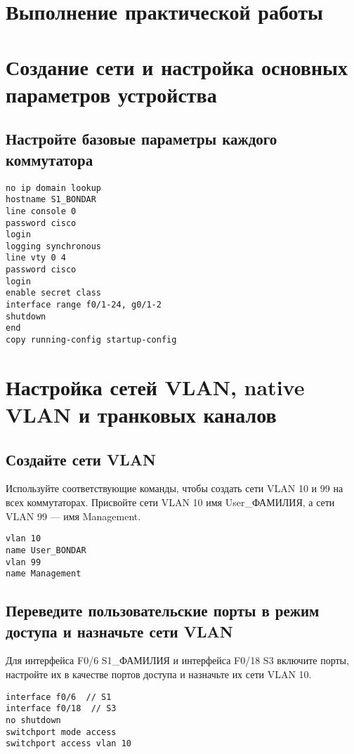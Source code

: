 \section{Выполнение практической работы}

\section{Создание сети и настройка основных параметров устройства}

\subsection{Настройте базовые параметры каждого коммутатора}

\begin{verbatim}
no ip domain lookup
hostname S1_BONDAR
line console 0
password cisco
login
logging synchronous
line vty 0 4
password cisco
login
enable secret class
interface range f0/1-24, g0/1-2
shutdown
end
copy running-config startup-config
\end{verbatim}

\section{Настройка сетей VLAN, native VLAN и транковых каналов}

\subsection{Создайте сети VLAN}

Используйте соответствующие команды,
чтобы создать сети VLAN 10 и 99 на всех коммутаторах.
Присвойте сети VLAN 10 имя User\_ФАМИЛИЯ, а сети VLAN 99 --- имя Management.

\begin{verbatim}
vlan 10
name User_BONDAR
vlan 99
name Management
\end{verbatim}

\subsection{Переведите пользовательские порты в режим доступа
	и назначьте сети VLAN}

Для интерфейса F0/6 S1\_ФАМИЛИЯ и интерфейса F0/18 S3 включите порты,
настройте их в качестве портов доступа и назначьте их сети VLAN 10.

\begin{verbatim}
interface f0/6  // S1
interface f0/18  // S3
no shutdown
switchport mode access
switchport access vlan 10
\end{verbatim}

